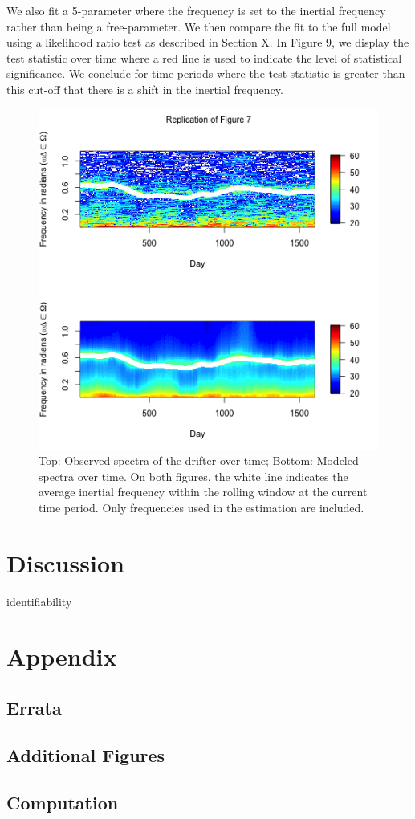 \documentclass{stat572Style}
\begin{document}
We also fit a 5-parameter where the frequency is set to the inertial frequency rather than being a free-parameter. 
We then compare the fit to the full model using a likelihood ratio test as described in Section X.
 In Figure 9, we display the test statistic over time where a red line is used to indicate the level of statistical significance. 
 We conclude for time periods where the test statistic is greater than this cut-off that there is a shift in the inertial frequency. 


\begin{figure}[hb]
	\label{fig:timeVarying}
  \centering
    \includegraphics[width=.5\textwidth]{fig7.png}
        \caption{Top: Observed spectra of the drifter over time; Bottom: Modeled spectra over time. On both figures, the white line indicates the average inertial frequency within the rolling window at the current time period.  Only frequencies used in the estimation are included.  }
\end{figure}

\section{Discussion}
identifiability 



\clearpage




\section{Appendix}

\subsection{Errata}

\subsection{Additional Figures}

\subsection{Computation}
\end{document}
